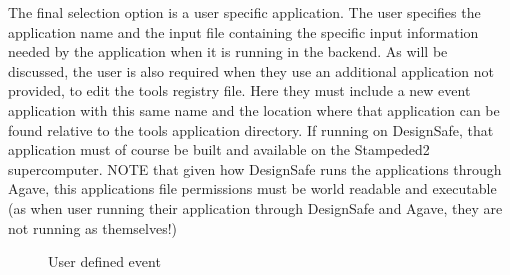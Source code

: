The final selection option is a user specific application. 
The user specifies the application name and the input file containing the specific input information 
needed by the application when it is running in the backend. 
As will be discussed, the user is also required when they use an additional application not provided, 
to edit the tools registry file. Here they must include a new event application with this same name 
and the location where that application can be found relative to the tools application directory. 
If running on DesignSafe, that application must of course be built and available on the Stampeded2 supercomputer. 
NOTE that given how DesignSafe runs the applications through Agave, this applications file permissions must be 
world readable and executable (as when user running their application through DesignSafe and Agave, they are not running as themselves!)

\begin{figure}[!htbp]
  \caption{User defined event}
  \label{fig:figure8}
\end{figure}
